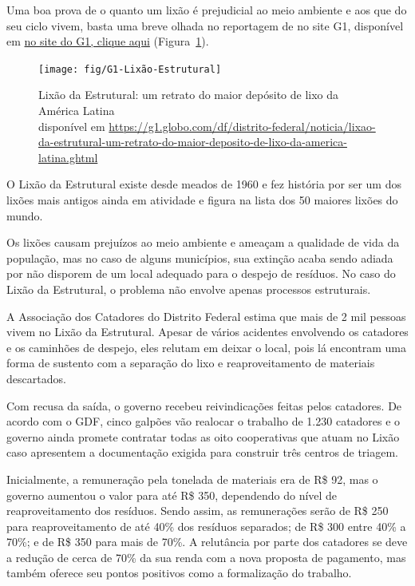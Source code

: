 Uma boa prova de o quanto um lixão é prejudicial ao meio ambiente e aos que do seu ciclo vivem, basta uma breve olhada no reportagem de  no site G1, disponível em \href{https://g1.globo.com/df/distrito-federal/noticia/lixao-da-estrutural-um-retrato-do-maior-deposito-de-lixo-da-america-latina.ghtml}{no site do G1, clique aqui} (Figura~\ref{fig:g1-lixao-estrutural}).

\begin{figure}
    \centering
    \texttt{[image: fig/G1-Lixão-Estrutural]}
    \caption[Lixão da Estrutural]{Lixão da Estrutural: um retrato do maior depósito de lixo da América Latina \\ disponível em \url{https://g1.globo.com/df/distrito-federal/noticia/lixao-da-estrutural-um-retrato-do-maior-deposito-de-lixo-da-america-latina.ghtml}}
    \label{fig:g1-lixao-estrutural}
\end{figure}

O Lixão da Estrutural existe desde meados de 1960 e fez história por ser um dos lixões mais antigos ainda em atividade e figura na lista dos 50 maiores lixões do mundo.

Os lixões causam prejuízos ao meio ambiente e ameaçam a qualidade de vida da população, mas no caso de alguns municípios, sua extinção acaba sendo adiada por não disporem de um local adequado para o despejo de resíduos. No caso do Lixão da Estrutural, o problema não envolve apenas processos estruturais.

A Associação dos Catadores do Distrito Federal estima que mais de 2 mil pessoas vivem no Lixão da Estrutural. Apesar de vários acidentes envolvendo os catadores e os caminhões de despejo, eles relutam em deixar o local, pois lá encontram uma forma de sustento com a separação do lixo e reaproveitamento de materiais descartados.

Com recusa da saída, o governo recebeu reivindicações feitas pelos catadores. De acordo com o GDF, cinco galpões vão realocar o trabalho de 1.230 catadores e o governo ainda promete contratar todas as oito cooperativas que atuam no Lixão caso apresentem a documentação exigida para construir três centros de triagem.

Inicialmente, a remuneração pela tonelada de materiais era de R\$ 92, mas o governo aumentou o valor para até R\$ 350, dependendo do nível de reaproveitamento dos resíduos. Sendo assim, as remunerações serão de R\$ 250 para reaproveitamento de até 40\% dos resíduos separados; de R\$ 300 entre 40\% a 70\%; e de R\$ 350 para mais de 70\%. A relutância por parte dos catadores se deve a redução de cerca de 70\% da sua renda com a nova proposta de pagamento, mas  também oferece seu pontos positivos como a formalização do trabalho. \nocite{CidadesInteligentes2018Lixao}

